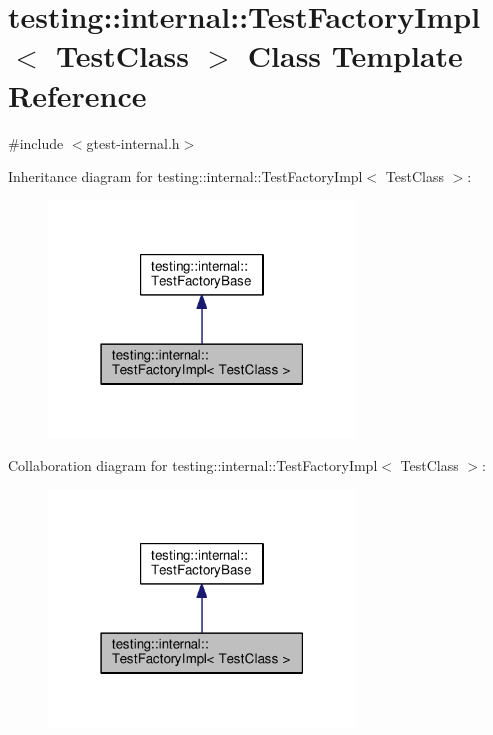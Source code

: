 \hypertarget{classtesting_1_1internal_1_1TestFactoryImpl}{}\section{testing\+:\+:internal\+:\+:Test\+Factory\+Impl$<$ Test\+Class $>$ Class Template Reference}
\label{classtesting_1_1internal_1_1TestFactoryImpl}


{\ttfamily \#include $<$gtest-\/internal.\+h$>$}



Inheritance diagram for testing\+:\+:internal\+:\+:Test\+Factory\+Impl$<$ Test\+Class $>$\+:\nopagebreak
\begin{figure}[H]
\begin{center}
\leavevmode
\includegraphics[width=231pt]{classtesting_1_1internal_1_1TestFactoryImpl__inherit__graph}
\end{center}
\end{figure}


Collaboration diagram for testing\+:\+:internal\+:\+:Test\+Factory\+Impl$<$ Test\+Class $>$\+:\nopagebreak
\begin{figure}[H]
\begin{center}
\leavevmode
\includegraphics[width=231pt]{classtesting_1_1internal_1_1TestFactoryImpl__coll__graph}
\end{center}
\end{figure}
